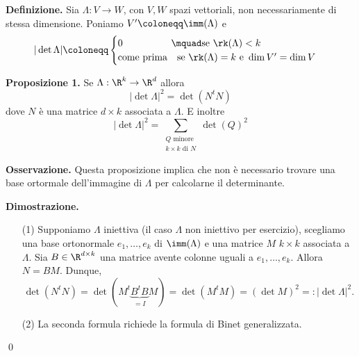 \textbf{Definizione.} Sia $\Lambda \colon V \to W$, con $V,W$ spazi vettoriali, non necessariamente di stessa dimensione. Poniamo $V' \coloneqq \imm(\Lambda)$ e 
%
$$
|\det \Lambda| \coloneqq 
\begin{cases}
	0 \qquad \qquad \quad \mquad \text{se } \rk (\Lambda) < k \\
	\text{come prima} \quad \text{se } \rk(\Lambda) = k \text{ e } \dim V' = \dim V
\end{cases} 
$$

\textbf{Proposizione 1.} Se $\Lambda : \R^k \to \R^d$ allora
%
\begin{equation}
	\tag{1}
	|\det \Lambda |^2 = \det (N^t N)
\end{equation}
%
dove $N$ è una matrice $d \times k$ associata a $\Lambda$.
E inoltre
%
\begin{equation}
	\tag{2}
	|\det \Lambda |^2 = \sum_{\substack{Q \text{ minore} \\ k \times k \text { di } N}} \det(Q)^2
\end{equation}
%

\textbf{Osservazione.} Questa proposizione implica che non è necessario trovare una base ortormale dell'immagine di $\Lambda$ per calcolarne il determinante.

\textbf{Dimostrazione.} 
\begin{itemize}

	\item[(1)] Supponiamo $\Lambda$ iniettiva (il caso $\Lambda$ non iniettivo per esercizio), scegliamo una base ortonormale $e_1,\ldots,e_k$ di $\imm(\Lambda)$ e una matrice $M$ $k \times k$ associata a $\Lambda$.
	Sia $B \in \R^{d \times k}$ una matrice avente colonne uguali a $e_1,\ldots,e_k$. Allora $N = BM$.
	Dunque, 
	$$
		\det(N^t N) = \det(M^t \underbrace{B^t B}_{= I} M) = \det (M^t M) = (\det M)^2 =: |\det \Lambda|^2.
	$$
	

	\item[(2)] La seconda formula richiede la formula di Binet generalizzata.

\end{itemize}
\qed

